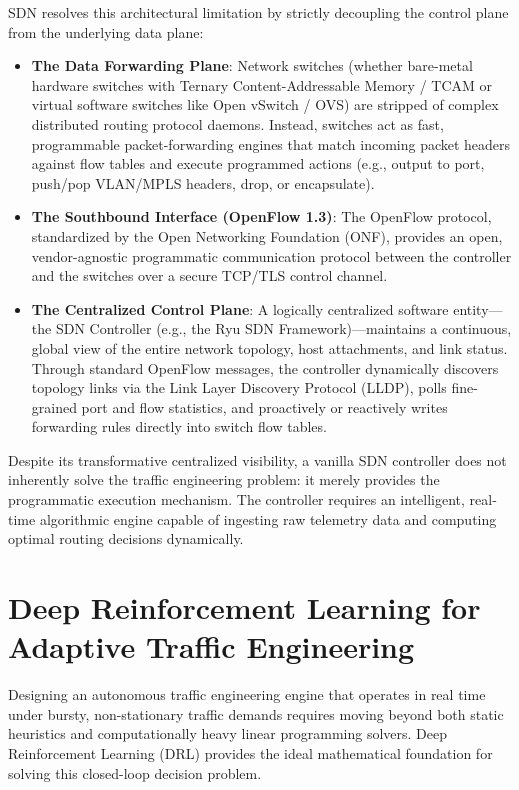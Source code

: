 \documentclass[12pt,a4paper,oneside]{report}
\begin{document}
SDN resolves this architectural limitation by strictly decoupling the control plane from the underlying data plane:
\begin{itemize}
    \item \textbf{The Data Forwarding Plane}: Network switches (whether bare-metal hardware switches with Ternary Content-Addressable Memory / TCAM or virtual software switches like Open vSwitch / OVS) are stripped of complex distributed routing protocol daemons. Instead, switches act as fast, programmable packet-forwarding engines that match incoming packet headers against flow tables and execute programmed actions (e.g., output to port, push/pop VLAN/MPLS headers, drop, or encapsulate).
    \item \textbf{The Southbound Interface (OpenFlow 1.3)}: The OpenFlow protocol, standardized by the Open Networking Foundation (ONF), provides an open, vendor-agnostic programmatic communication protocol between the controller and the switches over a secure TCP/TLS control channel.
    \item \textbf{The Centralized Control Plane}: A logically centralized software entity---the SDN Controller (e.g., the Ryu SDN Framework)---maintains a continuous, global view of the entire network topology, host attachments, and link status. Through standard OpenFlow messages, the controller dynamically discovers topology links via the Link Layer Discovery Protocol (LLDP), polls fine-grained port and flow statistics, and proactively or reactively writes forwarding rules directly into switch flow tables.
\end{itemize}

Despite its transformative centralized visibility, a vanilla SDN controller does not inherently solve the traffic engineering problem: it merely provides the programmatic execution mechanism. The controller requires an intelligent, real-time algorithmic engine capable of ingesting raw telemetry data and computing optimal routing decisions dynamically.

\section{Deep Reinforcement Learning for Adaptive Traffic Engineering}
Designing an autonomous traffic engineering engine that operates in real time under bursty, non-stationary traffic demands requires moving beyond both static heuristics and computationally heavy linear programming solvers. Deep Reinforcement Learning (DRL) provides the ideal mathematical foundation for solving this closed-loop decision problem.
\end{document}
